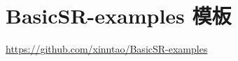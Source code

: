 \documentclass[../main.tex]{subfiles}
\begin{document}
\chapter{BasicSR-examples 模板}
\vspace{-2cm}

\url{https://github.com/xinntao/BasicSR-examples}
\end{document}
